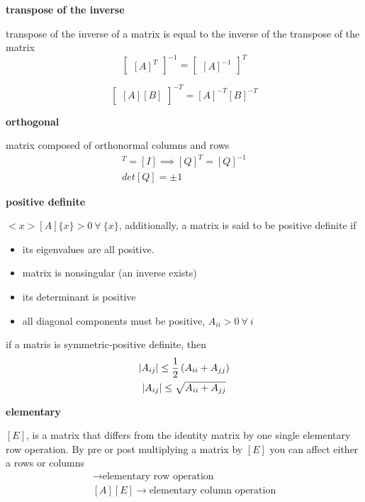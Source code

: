 \documentclass[letterpaper, 10pt, oneside]{article}
\newenvironment{dd}[1]{
	\noindent
	\textbf{\normalsize{#1}}
	\hspace{0.1in}
	\small
	\rmfamily
	}
	{\medskip}
\DeclarePairedDelimiter\abs{\lvert}{\rvert}%
\begin{document}
\begin{dd}{transpose of the inverse}
transpose of the inverse of a matrix is equal to the inverse of the transpose of the matrix
\[
\begin{bmatrix}
[A]^T
\end{bmatrix}^{-1}
 = 
 \begin{bmatrix}
[A]^{-1}
\end{bmatrix}^{T}
\]

\[
\begin{bmatrix}
[A][B]
\end{bmatrix}^{-T}
 = [A]^{-T}[B]^{-T} \]
\end{dd}

\begin{dd}{orthogonal}
matrix composed of orthonormal columns and rows
\begin{gather*}
[Q][Q]^T=[I] \implies [Q]^T = [Q]^{-1}\\
det[Q] = \pm 1
\end{gather*}
\end{dd}

\begin{dd}{positive definite} 
$<x>[A]\{x\} >0 \ \forall \ \{x\}$, additionally, a matrix is said to be positive definite if
\begin{itemize}
	\item its eigenvalues are all positive.
	\item matrix is nonsingular (an inverse exists)
	\item its determinant is positive
	\item all diagonal components must be positive, $A_{ii} > 0 \ \forall \ i$
\end{itemize}

if a matris is symmetric-positive definite, then
\begin{gather*}
	\abs{A_{ij}} \le \frac{1}{2} \left( A_{ii} + A_{jj} \right) \\
	\abs{A_{ij}} \le \sqrt{ A_{ii} + A_{jj}}
\end{gather*} 
\end{dd}

\begin{dd}{elementary}
$[E]$, is a matrix that differs from the identity matrix by one single elementary row operation. By pre or post multiplying a matrix by $[E]$ you can affect either a rows or columns 
\begin{gather*}
	[E][A] \rightarrow \text{elementary row operation}\\
	[A][E] \rightarrow \text{elementary column operation}
\end{gather*}
\end{dd}
\end{document}
